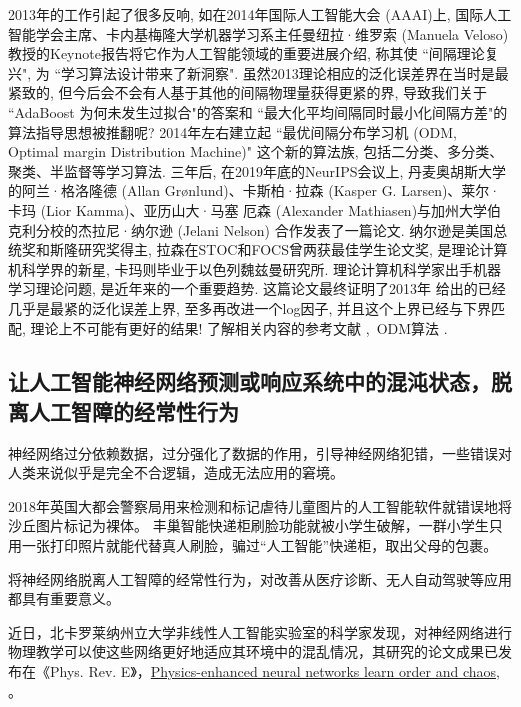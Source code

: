 2013年的工作引起了很多反响, 如在2014年国际人工智能大会 (AAAI)上, 国际人工智能学会主席、卡内基梅隆大学机器学习系主任曼纽拉·维罗索 (Manuela Veloso) 教授的Keynote报告将它作为人工智能领域的重要进展介绍, 称其使 ``间隔理论复兴", 为 ``学习算法设计带来了新洞察".
虽然2013理论相应的泛化误差界在当时是最紧致的, 但今后会不会有人基于其他的间隔物理量获得更紧的界, 导致我们关于  ``AdaBoost 为何未发生过拟合"的答案和 ``最大化平均间隔同时最小化间隔方差"的算法指导思想被推翻呢?
2014年左右建立起 ``最优间隔分布学习机 (ODM, Optimal margin Distribution Machine)" 这个新的算法族, 包括二分类、多分类、聚类、半监督等学习算法. 
三年后, 在2019年底的NeurIPS会议上, 丹麦奥胡斯大学的阿兰·格洛隆德 (Allan Grønlund)、卡斯柏·拉森 (Kasper G. Larsen)、莱尔·卡玛 (Lior Kamma)、亚历山大·马塞 厄森 (Alexander Mathiasen)与加州大学伯克利分校的杰拉尼·纳尔逊 (Jelani Nelson) 合作发表了一篇论文.
纳尔逊是美国总统奖和斯隆研究奖得主, 拉森在STOC和FOCS曾两获最佳学生论文奖, 是理论计算机科学界的新星, 卡玛则毕业于以色列魏兹曼研究所.
理论计算机科学家出手机器学习理论问题, 是近年来的一个重要趋势.
这篇论文最终证明了2013年 \cite{ZhouDBLP} 给出的已经几乎是最紧的泛化误差上界, 至多再改进一个log因子, 并且这个上界已经与下界匹配, 理论上不可能有更好的结果!
了解相关内容的参考文献 \cite{Zhou978-3-319-11656-3-1},\, ODM算法 \cite{Zhang2020-8638559,NIPS2019-9365}.
\subsection{让人工智能神经网络预测或响应系统中的混沌状态，脱离人工智障的经常性行为}
\begin{remark}
    神经网络过分依赖数据，过分强化了数据的作用，引导神经网络犯错，一些错误对人类来说似乎是完全不合逻辑，造成无法应用的窘境。
\end{remark}
\begin{newexam}
    2018年英国大都会警察局用来检测和标记虐待儿童图片的人工智能软件就错误地将沙丘图片标记为裸体。
    丰巢智能快递柜刷脸功能就被小学生破解，一群小学生只用一张打印照片就能代替真人刷脸，骗过“人工智能”快递柜，取出父母的包裹。
\end{newexam}

将神经网络脱离人工智障的经常性行为，对改善从医疗诊断、无人自动驾驶等应用都具有重要意义。

近日，北卡罗莱纳州立大学非线性人工智能实验室的科学家发现，对神经网络进行物理教学可以使这些网络更好地适应其环境中的混乱情况，其研究的论文成果已发布在《Phys. Rev. E》，\href{https://journals.aps.org/pre/abstract/10.1103/PhysRevE.101.062207}{Physics-enhanced neural networks learn order and chaos}, \cite{PhysRev2020-062207}。

